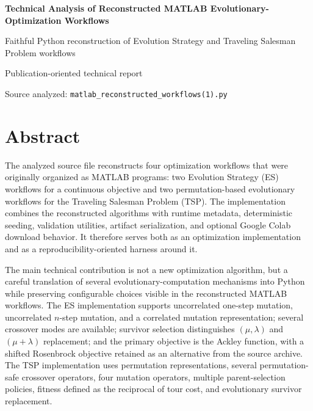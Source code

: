 \documentclass[11pt,a4paper]{article}
\begin{document}
\begin{titlepage}
\centering
\vspace*{25mm}
{\Huge\bfseries Technical Analysis of Reconstructed MATLAB Evolutionary-Optimization Workflows\par}
\vspace{9mm}
{\Large Faithful Python reconstruction of Evolution Strategy and Traveling Salesman Problem workflows\par}
\vfill
{\large Publication-oriented technical report\par}
\vspace{6mm}
{\large Source analyzed: \texttt{matlab\_reconstructed\_workflows(1).py}\par}
\vspace*{20mm}
\end{titlepage}

\tableofcontents
\clearpage
{}

\section*{Abstract}
The analyzed source file reconstructs four optimization workflows that were originally organized as MATLAB programs: two Evolution Strategy (ES) workflows for a continuous objective and two permutation-based evolutionary workflows for the Traveling Salesman Problem (TSP). The implementation combines the reconstructed algorithms with runtime metadata, deterministic seeding, validation utilities, artifact serialization, and optional Google Colab download behavior. It therefore serves both as an optimization implementation and as a reproducibility-oriented harness around it.

The main technical contribution is not a new optimization algorithm, but a careful translation of several evolutionary-computation mechanisms into Python while preserving configurable choices visible in the reconstructed MATLAB workflows. The ES implementation supports uncorrelated one-step mutation, uncorrelated $n$-step mutation, and a correlated mutation representation; several crossover modes are available; survivor selection distinguishes $(\mu,\lambda)$ and $(\mu+\lambda)$ replacement; and the primary objective is the Ackley function, with a shifted Rosenbrock objective retained as an alternative from the source archive. The TSP implementation uses permutation representations, several permutation-safe crossover operators, four mutation operators, multiple parent-selection policies, fitness defined as the reciprocal of tour cost, and evolutionary survivor replacement.
\end{document}
